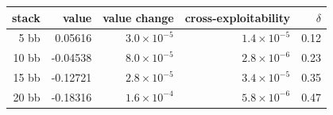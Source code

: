 \begin{tabular}{rrrrr}
\toprule
stack & value & value change & cross-exploitability & $\delta$ \\ \midrule
5 bb & 0.05616 & $3.0\times10^{-5}$ & $1.4\times10^{-5}$ & 0.12 \\
10 bb & -0.04538 & $8.0\times10^{-5}$ & $2.8\times10^{-6}$ & 0.23 \\
15 bb & -0.12721 & $2.8\times10^{-5}$ & $3.4\times10^{-5}$ & 0.35 \\
20 bb & -0.18316 & $1.6\times10^{-4}$ & $5.8\times10^{-6}$ & 0.47 \\
\bottomrule
\end{tabular}
